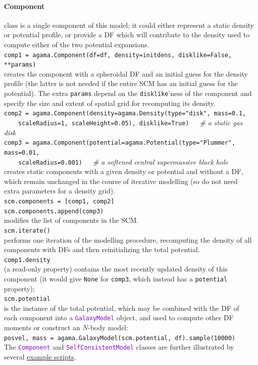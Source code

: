 \documentclass[12pt]{article}
\newcommand{\ttt}[1]{\textcolor{darkviolet}{\texttt{#1}}}
\begin{document}
\paragraph{Component} class is a single component of this model; it could either represent a static density or potential profile, or provide a DF which will contribute to the density used to compute either of the two potential expansions.\\[2mm]
\texttt{comp1 = agama.Component(df=df, density=initdens, disklike=False, **params)}\\
creates the component with a spheroidal DF and an initial guess for the density profile (the latter is not needed if the entire SCM has an initial guess for the potential). The extra \texttt{params} depend on the \texttt{disklike}'ness of the component and specify the size and extent of spatial grid for recomputing its density.\\[1mm]
\texttt{comp2 = agama.Component(density=agama.Density(type="disk", mass=0.1,\\
\mbox{}~~~~scaleRadius=1, scaleHeight=0.05), disklike=True)\ \ \ }\textit{\color{Sepia}\# a static gas disk}\\
\texttt{comp3 = agama.Component(potential=agama.Potential(type="Plummer", mass=0.01,\\
\mbox{}~~~~scaleRadius=0.001)\ \ \ }\textit{\color{Sepia}\# a softened central supermassive black hole}\\
creates static components with a given density or potential and without a DF, which remain unchanged in the course of iterative modelling (so do not need extra parameters for a density grid).\\[2mm]
\texttt{scm.components = [comp1, comp2]}\\
\texttt{scm.components.append(comp3)}\\
modifies the list of components in the SCM.\\[2mm]
\texttt{scm.iterate()}\\
performs one iteration of the modelling procedure, recomputing the density of all components with DFs and then reinitializing the total potential.\\[2mm]
\texttt{comp1.density}\\
(a read-only property) contains the most recently updated density of this component (it would give \texttt{None} for \texttt{comp3}, which instead has a \texttt{potential} property); \\[2mm]
\texttt{scm.potential}\\ is the instance of the total potential, which may be combined with the DF of each component into a \ttt{GalaxyModel} object, and used to compute other DF moments or construct an $N$-body model:\\
\texttt{posvel, mass = agama.GalaxyModel(scm.potential, df).sample(10000)}\\[2mm]
The \ttt{Component} and \ttt{SelfConsistentModel} classes are further illustrated by several \hyperref[sec:ExampleSCM]{example scripts}.
\end{document}
